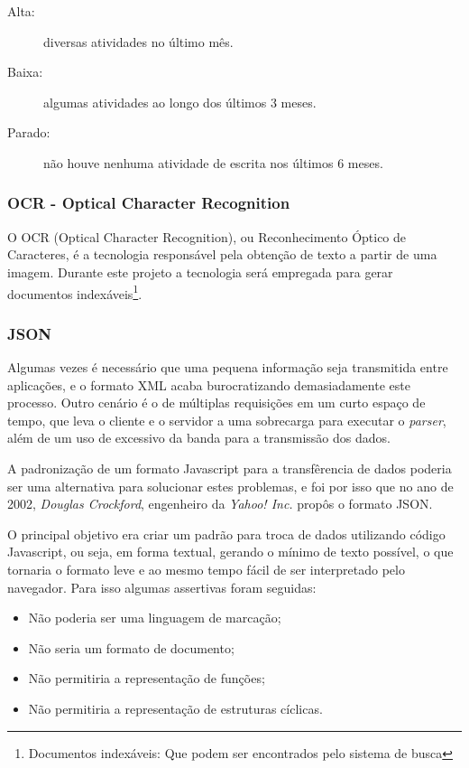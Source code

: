 \begin{description}
    \item[Alta:] diversas atividades no último mês.
    \item[Baixa:] algumas atividades ao longo dos últimos 3 meses.
    \item[Parado:] não houve nenhuma atividade de escrita nos últimos 6 meses.
\end{description}

\subsubsection{OCR - Optical Character Recognition}

O OCR (Optical Character Recognition), ou Reconhecimento Óptico de Caracteres, 
é a tecnologia responsável pela obtenção de texto a partir de uma imagem. Durante
este projeto a tecnologia será empregada para gerar documentos indexáveis\footnote{Documentos indexáveis: Que
podem ser encontrados pelo sistema de busca}.

\subsubsection{JSON}
Algumas vezes é necessário que uma pequena informação seja transmitida entre aplicações, e o formato XML acaba
burocratizando demasiadamente este processo. Outro cenário é o de múltiplas requisições em um curto espaço de
tempo, que leva o cliente e o servidor a uma sobrecarga para executar o \emph{parser}, além de um uso de
excessivo da banda para a transmissão dos dados.

A padronização de um formato Javascript para a transfêrencia de dados poderia ser uma alternativa para
solucionar estes problemas, e foi por isso que no ano de 2002, \emph{Douglas Crockford}, engenheiro da
\emph{Yahoo! Inc.} propôs o formato JSON.

O principal objetivo era criar um padrão para troca de dados utilizando código Javascript, ou seja, em forma
textual, gerando o mínimo de texto possível, o que tornaria o formato leve e ao mesmo tempo fácil de ser
interpretado pelo navegador. Para isso algumas assertivas foram seguidas:

\begin{itemize}
    \item Não poderia ser uma linguagem de marcação;
    \item Não seria um formato de documento;
    \item Não permitiria a representação de funções;
    \item Não permitiria a representação de estruturas cíclicas.
\end{itemize}

